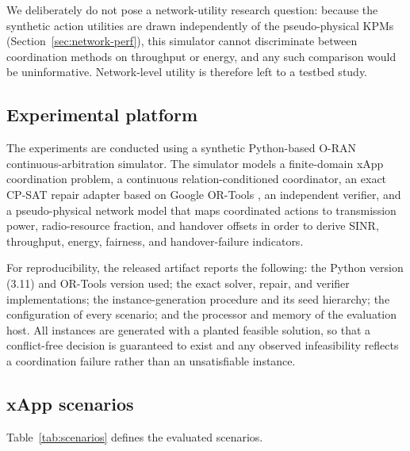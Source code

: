\documentclass[pdflatex,sn-mathphys-num,iicol,oneside]{sn-jnl}
\begin{document}
We deliberately do not pose a network-utility research question:
because the synthetic action utilities are drawn independently of the
pseudo-physical KPMs (Section~\ref{sec:network-perf}), this simulator
cannot discriminate between coordination methods on throughput or
energy, and any such comparison would be uninformative. Network-level
utility is therefore left to a testbed study.

\subsection{Experimental platform}

The experiments are conducted using a synthetic Python-based O-RAN
continuous-arbitration simulator. The simulator models a
finite-domain xApp coordination problem, a continuous
relation-conditioned coordinator, an exact CP-SAT repair adapter
based on Google OR-Tools \cite{ortools}, an independent verifier, and
a pseudo-physical network model that maps coordinated actions to
transmission power, radio-resource fraction, and handover offsets in
order to derive SINR, throughput, energy, fairness, and
handover-failure indicators.

For reproducibility, the released artifact reports the following: the
Python version (3.11) and OR-Tools version used; the exact solver,
repair, and verifier implementations; the instance-generation
procedure and its seed hierarchy; the configuration of every
scenario; and the processor and memory of the evaluation host. All
instances are generated with a planted feasible solution, so that a
conflict-free decision is guaranteed to exist and any observed
infeasibility reflects a coordination failure rather than an
unsatisfiable instance.

\subsection{xApp scenarios}

Table~\ref{tab:scenarios} defines the evaluated scenarios.
\end{document}
